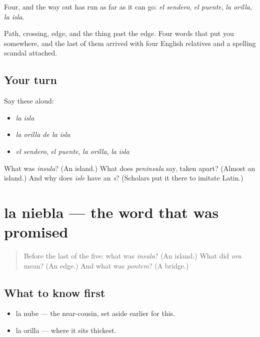 \begin{grammarlens}[title={What you've built}]
Four, and the way out has run as far as it can go: \emph{el sendero}, \emph{el puente}, \emph{la orilla}, \emph{la isla}.

Path, crossing, edge, and the thing past the edge. Four words that put you somewhere, and the last of them arrived with four English relatives and a spelling scandal attached.
\end{grammarlens}

\subsection*{Your turn}
Say these aloud:

\begin{itemize}
\raggedright
  \item \emph{la isla}
  \item \emph{la orilla de la isla}
  \item \emph{el sendero}, \emph{el puente}, \emph{la orilla}, \emph{la isla}
\end{itemize}

\begin{tcolorbox}[breakable,colback=teal!4,colframe=teal!35!black,title={Before you move on}]
What was \emph{insula}? (An island.) What does \emph{peninsula} say, taken apart? (Almost an island.) And why does \emph{isle} have an \emph{s}? (Scholars put it there to imitate Latin.)
\end{tcolorbox}
\section[la niebla]{la niebla — the word that was promised}

\label{lesson:ES-C295-niebla}



\begin{quote}
Before the last of the five: what was \emph{insula}? (An island.) What did \emph{ora} mean? (An edge.) And what was \emph{pontem}? (A bridge.)
\end{quote}

\subsection*{What to know first}
\begin{itemize}
\raggedright
  \item la nube — the near-cousin, set aside earlier for this.
  \item la orilla — where it sits thickest.
\end{itemize}

